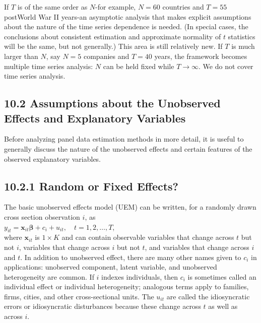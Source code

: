 \documentclass[10pt]{article}
\begin{document}
If $T$ is of the same order as $N$-for example, $N=60$ countries and $T=55$ postWorld War II years-an asymptotic analysis that makes explicit assumptions about the nature of the time series dependence is needed. (In special cases, the conclusions about consistent estimation and approximate normality of $t$ statistics will be the same, but not generally.) This area is still relatively new. If $T$ is much larger than $N$, say $N=5$ companies and $T=40$ years, the framework becomes multiple time series analysis: $N$ can be held fixed while $T \rightarrow \infty$. We do not cover time series analysis.

\subsection*{10.2 Assumptions about the Unobserved Effects and Explanatory Variables}
Before analyzing panel data estimation methods in more detail, it is useful to generally discuss the nature of the unobserved effects and certain features of the observed explanatory variables.

\subsection*{10.2.1 Random or Fixed Effects?}
The basic unobserved effects model (UEM) can be written, for a randomly drawn cross section observation $i$, as\\
$y_{i t}=\mathbf{x}_{i t} \boldsymbol{\beta}+c_{i}+u_{i t}, \quad t=1,2, \ldots, T$,\\
where $\mathbf{x}_{i t}$ is $1 \times K$ and can contain observable variables that change across $t$ but not $i$, variables that change across $i$ but not $t$, and variables that change across $i$ and $t$. In addition to unobserved effect, there are many other names given to $c_{i}$ in applications: unobserved component, latent variable, and unobserved heterogeneity are common. If $i$ indexes individuals, then $c_{i}$ is sometimes called an individual effect or individual heterogeneity; analogous terms apply to families, firms, cities, and other cross-sectional units. The $u_{i t}$ are called the idiosyncratic errors or idiosyncratic disturbances because these change across $t$ as well as across $i$.
\end{document}
